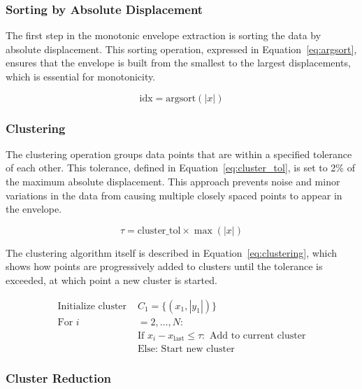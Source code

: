 \documentclass[11pt,a4paper]{article}
\begin{document}
\subsubsection{Sorting by Absolute Displacement}

The first step in the monotonic envelope extraction is sorting the data by absolute displacement. This sorting operation, expressed in Equation~\ref{eq:argsort}, ensures that the envelope is built from the smallest to the largest displacements, which is essential for monotonicity.

\begin{equation}
\text{idx} = \text{argsort}(|x|)
\label{eq:argsort}
\end{equation}

\subsubsection{Clustering}

The clustering operation groups data points that are within a specified tolerance of each other. This tolerance, defined in Equation~\ref{eq:cluster_tol}, is set to 2\% of the maximum absolute displacement. This approach prevents noise and minor variations in the data from causing multiple closely spaced points to appear in the envelope.

\begin{equation}
\tau = \text{cluster\_tol} \times \max(|x|)
\label{eq:cluster_tol}
\end{equation}

The clustering algorithm itself is described in Equation~\ref{eq:clustering}, which shows how points are progressively added to clusters until the tolerance is exceeded, at which point a new cluster is started.

\begin{equation}
\begin{aligned}
\text{Initialize cluster } &C_1 = \{(x_1, |y_1|)\} \\
\text{For } i &= 2, \ldots, N: \\
& \text{If } x_i - x_{\text{last}} \le \tau: \text{ Add to current cluster} \\
& \text{Else: Start new cluster}
\end{aligned}
\label{eq:clustering}
\end{equation}

\subsubsection{Cluster Reduction}
\end{document}
